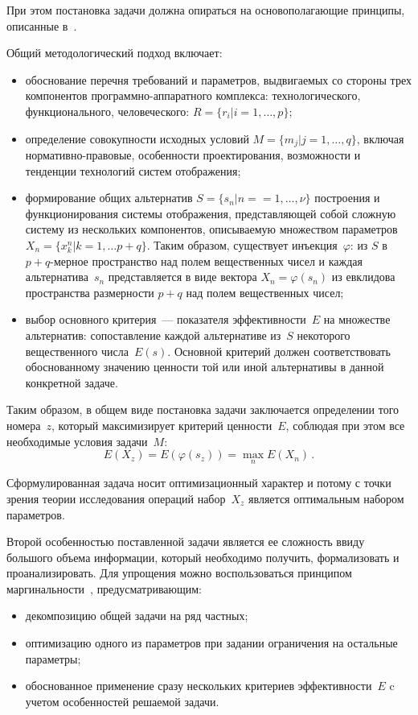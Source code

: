 \begin{multicols}{2}
   При этом постановка задачи должна опираться на основополагающие 
принципы, описанные в~\cite{8chu, 9chu}.
   
   Общий методологический подход включает: 
\begin{itemize}
\item обоснование перечня требований и па\-ра\-мет\-ров, выдвигаемых со 
стороны трех компонентов программно-аппаратного комплекса: 
технологического, функционального, человеческого: $R = \{r_i \vert i = 1, 
\ldots , p\}$; 
\item определение совокупности исходных условий $M = \{m_j \vert j = 1, 
\ldots , q\}$, включая нормативно-правовые, особенности проектирования, 
возможности и тенденции технологий систем отоб\-ра\-жения;
\item формирование общих альтернатив $S = \{s_n \vert n =$\linebreak $= 1, \ldots , \nu\}$ 
построения и функционирования системы отображения, представляющей 
собой сложную систему из нескольких компонентов, описываемую 
множеством параметров $X_n = \{x_k^n\vert k=1, \ldots p+q\}$. Таким 
образом, существует инъекция~$\varphi$: из $S$ в~$p+q$-мерное 
пространство над полем вещественных чисел и каждая 
альтернатива~$s_n$ представляется в виде вектора $X_n = \varphi (s_n)$ из 
евклидова пространства размерности $p+q$ над полем вещественных чисел; 
\item выбор основного критерия~--- показателя эффективности~$E$ на 
множестве альтернатив: сопоставление каждой альтернативе из~$S$ 
некоторого вещественного числа~$E(s)$. Основной крите\-рий должен 
соответствовать обоснованному значению ценности той или иной 
альтернативы в данной конкретной задаче. 
\end{itemize}

    Таким образом, в общем виде постановка задачи заключается 
определении того номера~$z$, который максимизирует критерий 
ценности~$E$, соблюдая при этом все необходимые условия задачи~$M$: 
    \begin{equation*}
    E(X_z) =E(\varphi(s_z))=\underset{n}{\max} E(X_n)\,.
    \end{equation*}
    
    Сформулированная задача носит оптимизационный характер и потому с 
точки зрения теории исследования операций набор~$X_z$ является 
оптимальным набором параметров. 
    
    Второй особенностью поставленной задачи является ее сложность ввиду 
большого объема информации, который необходимо получить, 
формализовать и проанализировать. Для упрощения можно воспользоваться 
принципом маргиналь\-ности~\cite{8chu}, предусматривающим: 
    \begin{itemize}
    \item декомпозицию общей задачи на ряд частных;
\item оптимизацию одного из параметров при задании ограничения на 
остальные параметры;
\item обоснованное применение сразу нескольких критериев 
эффективности~$E$ c учетом особенностей решаемой задачи. 
\end{itemize}


\end{multicols}
